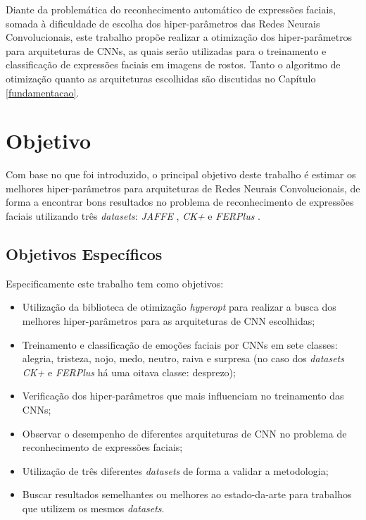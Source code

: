 \documentclass[
12pt,				%
openright,			%
oneside,			%
a4paper,			%
english,			%
french,				%
spanish,			%
brazil				%
]{abntex2}
\begin{document}
Diante da problemática do reconhecimento automático de expressões faciais, somada à dificuldade de escolha dos hiper-parâmetros das Redes Neurais Convolucionais, este trabalho propõe realizar a otimização dos hiper-parâmetros para arquiteturas de CNNs, as quais serão utilizadas para o treinamento e classificação de expressões faciais em imagens de rostos. Tanto o algoritmo de otimização quanto as arquiteturas escolhidas são discutidas no Capítulo \ref{fundamentacao}.

\section{Objetivo} \label{objetivo}

Com base no que foi introduzido, o principal objetivo deste trabalho é estimar os melhores hiper-parâmetros para arquiteturas de Redes Neurais Convolucionais, de forma a encontrar bons resultados no problema de reconhecimento de expressões faciais utilizando três \textit{datasets}: \textit{JAFFE} \cite{lyons1998coding}, \textit{CK+} \cite{lucey2010extended} e \textit{FERPlus} \cite{Barsoum:2016:TDN:2993148.2993165}.

\subsection{Objetivos Específicos} \label{objetivosespecificos}

Especificamente este trabalho tem como objetivos:

\begin{itemize}
    \item Utilização da biblioteca de otimização \textit{hyperopt} para realizar a busca dos melhores hiper-parâmetros para as arquiteturas de CNN escolhidas;
    \item Treinamento e classificação de emoções faciais por CNNs em sete classes: alegria, tristeza, nojo, medo, neutro, raiva e surpresa (no caso dos \textit{datasets} \textit{CK+} e \textit{FERPlus} há uma oitava classe: desprezo);
    \item Verificação dos hiper-parâmetros que mais influenciam no treinamento das CNNs;
    \item Observar o desempenho de diferentes arquiteturas de CNN no problema de reconhecimento de expressões faciais;
    \item Utilização de três diferentes \textit{datasets} de forma a validar a metodologia;
    \item Buscar resultados semelhantes ou melhores ao estado-da-arte para trabalhos que utilizem os mesmos \textit{datasets}.
\end{itemize}
\end{document}
